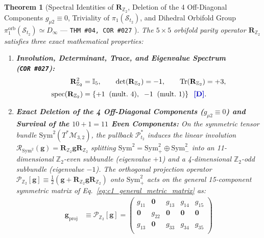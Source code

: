 \documentclass[11pt,a4paper]{article}
\newcommand{\catD}{\text{\textbf{\textcolor{blue!75!black}{[D]}}}}
\theoremstyle{definition}
\theoremstyle{plain}
\newtheorem{theorem}[axiom]{Theorem}
\theoremstyle{remark}
\begin{document}
\begin{theorem}[Spectral Identities of $\mathbf{R}_{\mathbb{Z}_2}$, Deletion of the 4 Off-Diagonal Components $g_{\mu 2} \equiv 0$, Triviality of $\pi_1(\mathcal{S}_{t_2})$, and Dihedral Orbifold Group $\pi_1^{\mathrm{orb}}(\mathcal{S}_{t_2}) \simeq D_\infty$ --- \texttt{THM~\#04, COR~\#027} \catD]\label{thm:c1_rz2_projection}\label{thm:c1_orbifold_mirror}
The $5\times 5$ orbifold parity operator $\mathbf{R}_{\mathbb{Z}_2}$ satisfies three exact mathematical properties:
\begin{enumerate}[label=(\roman*)]
  \item \textbf{Involution, Determinant, Trace, and Eigenvalue Spectrum (\texttt{COR~\#027}):}
  \begin{align}
  \mathbf{R}_{\mathbb{Z}_2}^2 &= \mathbb{I}_5, \qquad
  \det\!\left(\mathbf{R}_{\mathbb{Z}_2}\right) = -1, \qquad
  \mathrm{Tr}\!\left(\mathbf{R}_{\mathbb{Z}_2}\right) = +3, \nonumber \\[3pt]
  \mathrm{spec}\!\left(\mathbf{R}_{\mathbb{Z}_2}\right) &= \left\{ +1 \;\; (\textnormal{mult.\ } 4), \;\; -1 \;\; (\textnormal{mult.\ } 1) \right\} \;\;\catD. \label{eq:c1_rz2_spectrum}
  \end{align}
  \item \textbf{Exact Deletion of the 4 Off-Diagonal Components ($g_{\mu 2} \equiv 0$) and Survival of the $10 + 1 = 11$ Even Components:}
  On the symmetric tensor bundle $\mathrm{Sym}^2(T^*\mathcal{M}_{3,2})$, the pullback $\mathcal{P}_{t_2}^*$ induces the linear involution $\mathcal{R}_{\mathrm{Sym}^2}(\mathbf{g}) = \mathbf{R}_{\mathbb{Z}_2}\mathbf{g}\mathbf{R}_{\mathbb{Z}_2}$ splitting $\mathrm{Sym}^2 = \mathrm{Sym}^2_+ \oplus \mathrm{Sym}^2_-$ into an 11-dimensional $\mathbb{Z}_2$-even subbundle (eigenvalue $+1$) and a 4-dimensional $\mathbb{Z}_2$-odd subbundle (eigenvalue $-1$). The orthogonal projection operator $\mathcal{P}_{\mathbb{Z}_2}[\mathbf{g}] \equiv \frac{1}{2}\!\left(\mathbf{g} + \mathbf{R}_{\mathbb{Z}_2}\mathbf{g}\mathbf{R}_{\mathbb{Z}_2}\right)$ onto $\mathrm{Sym}^2_+$ acts on the general 15-component symmetric matrix of Eq.~\eqref{eq:c1_general_metric_matrix} as:
  \begin{align}
  \mathbf{g}_{\mathrm{proj}} &\equiv \mathcal{P}_{\mathbb{Z}_2}[\mathbf{g}] = \begin{pmatrix}
  g_{11} & \mathbf{0} & g_{13} & g_{14} & g_{15} \\
  \mathbf{0} & g_{22} & \mathbf{0} & \mathbf{0} & \mathbf{0} \\
  g_{13} & \mathbf{0} & g_{33} & g_{34} & g_{35} \\

\end{pmatrix}
\end{align}
\end{enumerate}
\end{theorem}
\end{document}
